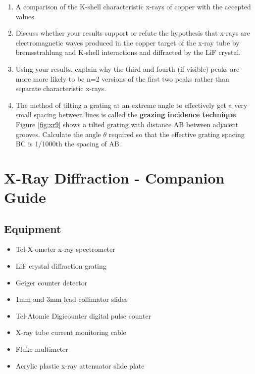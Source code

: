 \begin{enumerate}[resume]
\item A comparison of the K-shell characteristic x-rays of copper with the accepted values.

\item Discuss whether your results support or refute the hypothesis that x-rays are electromagnetic waves produced in the copper target of the x-ray tube by bremsstrahlung and K-shell interactions and diffracted by the LiF crystal.

\item Using your results, explain why the third and fourth (if visible) peaks are more more likely to be n=2 versions of the first two peaks rather than separate characteristic x-rays.

\item The method of tilting a grating at an extreme angle to effectively get a very small spacing between lines is called the {\bf grazing incidence technique}. Figure \ref{fig:xr9} shows a tilted grating with distance AB between adjacent grooves. Calculate the angle $\theta$ required so that the effective grating spacing BC is 1/1000th the spacing of AB.

\end{enumerate}


\AtEndDocument{\clearpage\ifodd\value{page}\else\null\clearpage\fi} %


\chapter{X-Ray Diffraction - Companion Guide}

\section{Equipment}

\begin{minipage}[t]{0.5\textwidth}
\begin{itemize}[noitemsep]
\item Tel-X-ometer x-ray spectrometer
\item LiF crystal diffraction grating
\item Geiger counter detector
\item 1mm and 3mm lead collimator slides
\end{itemize}
\end{minipage}
\begin{minipage}[t]{0.5\textwidth}
\begin{itemize}[noitemsep]
\item Tel-Atomic Digicounter digital pulse counter
\item X-ray tube current monitoring cable
\item Fluke multimeter
\item Acrylic plastic x-ray attenuator slide plate
\end{itemize}
\end{minipage}

